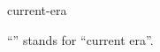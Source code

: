 \documentclass{stex}
\begin{document}
\begin{smodule}{current-era}
\begin{sparagraph}[style=symdoc]
``'' stands for ``current era''.
\end{sparagraph}
\end{smodule}
\end{document}
